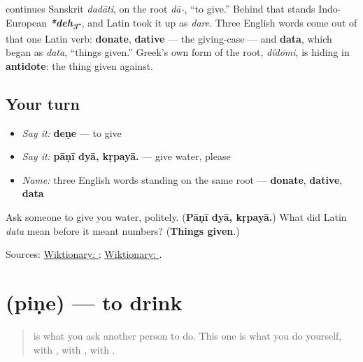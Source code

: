 \begin{cousinweb}
\textbf{} continues Sanskrit \textbf{} \emph{dadāti}, on the root \textbf{} \emph{dā-}, \textquotedblleft{}to give.\textquotedblright{} Behind that stands Indo-European \emph{\textbf{*deh\textsubscript{3}-}}, and Latin took it up as \emph{dare}. Three English words come out of that one Latin verb: \textbf{donate}, \textbf{dative} — the giving-case — and \textbf{data}, which began as \emph{data}, \textquotedblleft{}things given.\textquotedblright{} Greek's own form of the root, \emph{dídōmi}, is hiding in \textbf{antidote}: the thing given against.
\end{cousinweb}

\subsection*{Your turn}
\begin{itemize}
\raggedright
  \item \emph{Say it:} \textbf{deṇe} — to give
  \item \emph{Say it:} \textbf{pāṇī dyā, kṛpayā.} — give water, please
  \item \emph{Name:} three English words standing on the same root — \textbf{donate}, \textbf{dative}, \textbf{data}
\end{itemize}

\begin{tcolorbox}[breakable,colback=teal!4,colframe=teal!35!black,title={Before you move on}]
Ask someone to give you water, politely. (\textbf{Pāṇī dyā, kṛpayā.}) What did Latin \emph{data} mean before it meant numbers? (\textbf{Things given}.)

Sources: \href{https://en.wiktionary.org/wiki/\%E0\%A4\%A6\%E0\%A5\%87\%E0\%A4\%A3\%E0\%A5\%87}{Wiktionary: }; \href{https://en.wiktionary.org/wiki/\%E0\%A4\%A6\%E0\%A4\%BE}{Wiktionary: }.
\end{tcolorbox}
\section[piṇe]{ (piṇe) — to drink}

\label{lesson:MR-C22-pine}



\begin{quote}
\textbf{} is what you ask another person to do. This one is what you do yourself, with \textbf{}, with \textbf{}, with \textbf{}.
\end{quote}

